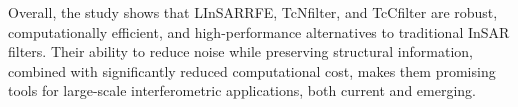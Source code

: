 \documentclass[remotesensing,article,submit,pdftex,moreauthors]{Definitions/mdpi}
\begin{document}
%
%
%

Overall, the study shows that LInSARRFE, TcNfilter, and TcCfilter are robust, computationally efficient, and high-performance alternatives to traditional InSAR filters. 
Their ability to reduce noise while preserving structural information, combined with significantly reduced computational cost, makes them promising tools for large-scale interferometric applications, both current and emerging.

\vspace{6pt} 



\end{document}
